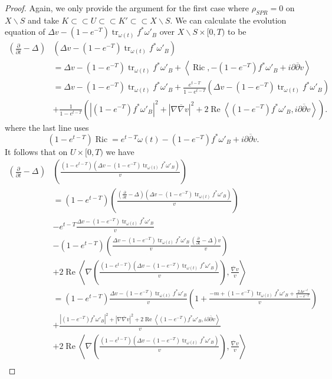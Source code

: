 \documentclass[12pt]{article}
\numberwithin{equation}{section}
\renewcommand{\d}{\partial}
\newcommand{\dbar}{\overline{\partial}}
\DeclareMathOperator{\Ric}{Ric}
\DeclareMathOperator{\tr}{tr}
\DeclareMathOperator{\Real}{Re}
\newcommand{\oo}[1]{\overline{#1}}
\newcommand{\parabolic}[1]{\left(\frac{\d}{\d t} - \Delta_{#1}\right)}
\newcommand{\ip}[1]{\left\langle#1\right\rangle}
\begin{document}
\begin{proof}
Again, we only provide the argument for the first case where $\rho_{SPR} = 0$ on $X \backslash S$ and take $K \subset \subset U \subset \subset K' \subset \subset X \backslash S$. We can calculate the evolution equation of $\Delta v - (1-e^{-T})\tr_{\omega(t)} f^*\omega'_B$ over $X \backslash S \times [0,T)$ to be 
\begin{align*}
    \parabolic{}&(\Delta v - (1-e^{-T})\tr_{\omega(t)} f^*\omega'_B)\\ &= \Delta v - (1-e^{-T})\tr_{\omega(t)}f^*\omega'_B+ \ip{\Ric, -(1-e^{-T})f^* \omega'_B + i\d\dbar v}\\
    &= \Delta v - (1-e^{-T})\tr_{\omega(t)} f^*\omega'_B+\frac{e^{t-T}}{1-e^{t-T}} (\Delta v - (1-e^{-T})\tr_{\omega(t)} f^*\omega'_B )\\
    &+ \frac{1}{1-e^{t-T}}\left(|(1-e^{-T})f^*\omega'_B|^2 + |\nabla \oo{\nabla} v|^2 + 2 \Real \ip{(1-e^{-T})f^*\omega'_B, i\d\dbar v }\right).
\end{align*}
where the last line uses
\begin{equation*}
    (1-e^{t-T}) \Ric = e^{t-T} \omega(t) - (1-e^{-T})f^*\omega'_B + i\d\dbar v.
\end{equation*}
It follows that on $U \times [0,T)$ we have 
\begin{align*}
    \parabolic{} &\left(\frac{(1-e^{t-T})(\Delta v - (1-e^{-T})\tr_{\omega(t)} f^*\omega'_B)}{v}\right)\\
    &= (1-e^{t-T}) \left(\frac{\parabolic{} (\Delta v - (1-e^{-T})\tr_{\omega(t)} f^*\omega'_B)}{v}\right)\\
    &-e^{t-T} \frac{\Delta v - (1-e^{-T}) \tr_{\omega(t)}f^*\omega'_B}{ v}\\
    &- (1-e^{t-T})\left(\frac{\Delta v - (1-e^{-T})\tr_{\omega(t)} f^*\omega'_B}{v} \frac{\parabolic{} v}{v}\right)\\
    &+ 2\Real \ip{\nabla \left(\frac{(1-e^{t-T})(\Delta v - (1-e^{-T})\tr_{\omega(t)} f^*\omega'_B)}{v}\right), \frac{\oo{\nabla} v}{v}}\\
    &= (1-e^{t-T}) \frac{\Delta v - (1-e^{-T})\tr_{\omega(t)} f^*\omega'_B}{v} \left(1+\frac{-m+(1-e^{-T})\tr_{\omega(t)}f^*\omega'_B + \frac{2A e^{-t}}{1-e^{-T}}}{v}\right)\\
    &+\frac{|(1-e^{-T})f^*\omega'_B|^2 + |\nabla \oo{\nabla} v|^2 + 2 \Real \ip{(1-e^{-T})f^*\omega'_B, i\d\dbar v }}{v}\\
    &+ 2\Real \ip{\nabla \left(\frac{(1-e^{t-T})(\Delta v - (1-e^{-T})\tr_{\omega(t)} f^*\omega'_B)}{v}\right), \frac{\oo{\nabla} v}{v}}\\

\end{align*}
\end{proof}
\end{document}
